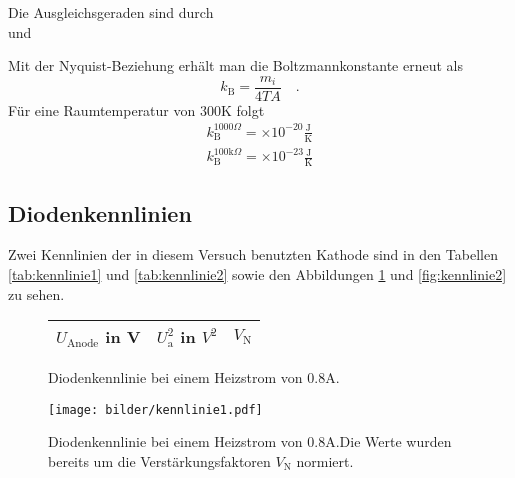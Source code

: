 		Die Ausgleichsgeraden sind durch
		\begin{equation}
			
		\end{equation}
		und
		\begin{equation}
			
		\end{equation}
		
		Mit der Nyquist-Beziehung erhält man die Boltzmannkonstante erneut als
		\begin{equation}
		k_\text{B}=\frac{m_i}{4 T A} \quad .
		\end{equation}
 		Für eine Raumtemperatur von $300$K folgt
		\begin{align}
		k_\text{B}^{1000\Omega}			=   \times 10^{-20}\frac{\text{J}}
																			{\text{K}} \\ 
		k_\text{B}^{100\text{k}\Omega}	=   \times 10^{-23}\frac{\text{J}}
																			{\text{K}} 
		\end{align}
	
	


\clearpage
\subsection{Diodenkennlinien}
	Zwei Kennlinien der in diesem Versuch benutzten Kathode sind in 
	den Tabellen \ref{tab:kennlinie1} und \ref{tab:kennlinie2} sowie 
	den Abbildungen \ref{fig:kennlinie1} und \ref{fig:kennlinie2} zu 
	sehen.
	
	\begin{figure}[htbp]
	\begin{minipage}{0.3\textwidth} 
			\centering
			\begin{tabular}{ccc}
				\toprule \midrule
				$U_\text{Anode}$ in V & $U_\text{a}^2$ in $V^2$ 
				& $V_\text{N}$\\
				\midrule
							
				\midrule \bottomrule
			\end{tabular}
			\caption{Diodenkennlinie bei einem Heizstrom von 
			$0.8$A.}
			\label{tab:kennlinie1}
	\end{minipage}
	\hfill
	\begin{minipage}{0.7\textwidth}
			\centering
			\texttt{[image: bilder/kennlinie1.pdf]}
			\caption{Diodenkennlinie bei einem Heizstrom von 
			$0.8$A.Die Werte wurden bereits um die 
			Verstärkungsfaktoren $V_\text{N}$ normiert. }
			\label{fig:kennlinie1}		
	\end{minipage}
	\end{figure}		
	
